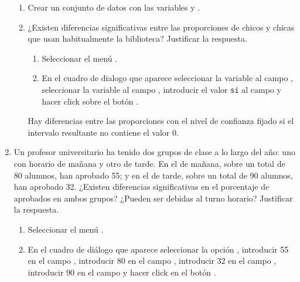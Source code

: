 \begin{enumerate}[leftmargin=*]
\begin{enumerate}
\item Crear un conjunto de datos con las variables  y .
\item ¿Existen diferencias significativas entre las proporciones de chicos y chicas que usan habitualmente la biblioteca? Justificar la
respuesta.
\begin{indicacion}
\begin{enumerate}
\item Seleccionar el menú .
\item En el cuadro de dialogo que aparece seleccionar la variable  al campo , seleccionar la
variable  al campo , introducir el valor \texttt{si} al campo  y hacer click sobre el botón
.
\end{enumerate}
Hay diferencias entre las proporciones con el nivel de confianza fijado si el intervalo resultante no contiene el valor 0.
\end{indicacion}
\end{enumerate}

\item Un profesor universitario ha tenido dos grupos de clase a lo largo del año: uno con horario de mañana y otro de
tarde. En el de mañana, sobre un total de 80 alumnos, han aprobado 55; y en el de tarde, sobre un total de 90 alumnos,
han aprobado 32. ¿Existen diferencias significativas en el porcentaje de aprobados en ambos grupos? ¿Pueden ser debidas al turno horario?
Justificar la respuesta.
\begin{indicacion}
\begin{enumerate}
\item Seleccionar el menú .
\item En el cuadro de diálogo que aparece seleccionar la opción , introducir 55 en el campo , introducir 80 en el campo
, introducir 32 en el campo , introducir 90 en el campo
 y hacer click en el botón .
\end{enumerate}
\end{indicacion}

\end{enumerate}



